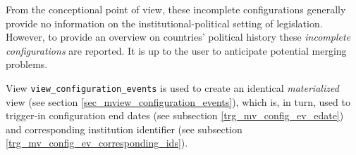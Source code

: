 From the conceptional point of view, these incomplete configurations generally provide no information on the institutional-political setting of legislation. However, to provide an overview on countries' political history these \emph{incomplete configurations} are reported. It is up to the user to anticipate potential merging problems.


View \texttt{\footnotesize view\_configuration\_events} is used to create an identical \emph{materialized} view (see section \ref{sec_mview_configuration_events}), which is, in turn, used to trigger-in configuration end dates (see subsection \ref{trg_mv_config_ev_edate}) and corresponding institution identifier (see subsection \ref{trg_mv_config_ev_corresponding_ids}).